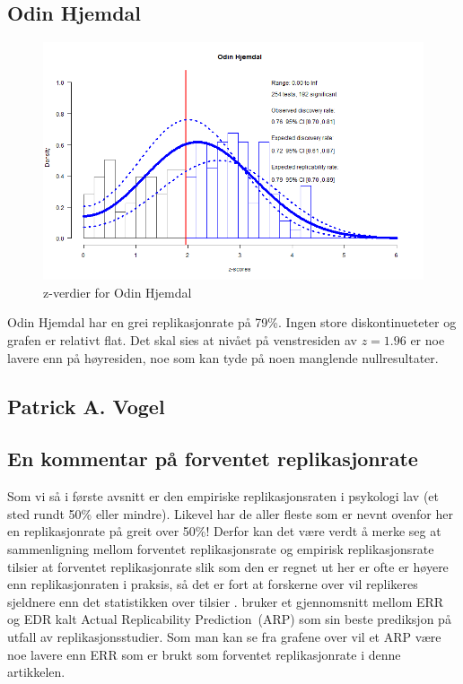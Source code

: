 \documentclass[doc,norsk]{apa7}
\begin{document}
\subsection{Odin Hjemdal}
\begin{figure}[h!]
    \centering
    \includegraphics[width=\textwidth]{images/Odin Hjemdal.png}
    \caption{z-verdier for Odin Hjemdal}
\end{figure}
Odin Hjemdal har en grei replikasjonrate på 79\%. Ingen store diskontinueteter og grafen er relativt flat. Det skal sies at nivået på venstresiden av $z=1.96$ er noe lavere enn på høyresiden, noe som kan tyde på noen manglende nullresultater.

\subsection{Patrick A. Vogel}



\subsection{En kommentar på forventet replikasjonrate}

Som vi så i første avsnitt er den empiriske replikasjonsraten i psykologi lav (et sted rundt 50\% eller mindre). Likevel har de aller fleste som er nevnt ovenfor her en replikasjonrate på greit over 50\%! Derfor kan det være verdt å merke seg at sammenligning mellom forventet replikasjonsrate og empirisk replikasjonsrate tilsier at forventet replikasjonrate slik som den er regnet ut her er ofte er høyere enn replikasjonraten i praksis, så det er fort at forskerne over vil replikeres sjeldnere enn det statistikken over tilsier \parencite{z-curve-implementasjon, z-curve-mot-empiri}. \textcite{arp} bruker et gjennomsnitt mellom ERR og EDR kalt \guillemetleft Actual Replicability Prediction\guillemetright\ (ARP) som sin beste prediksjon på utfall av replikasjonsstudier. Som man kan se fra grafene over vil et ARP være noe lavere enn ERR som er brukt som forventet replikasjonrate i denne artikkelen.
\end{document}
